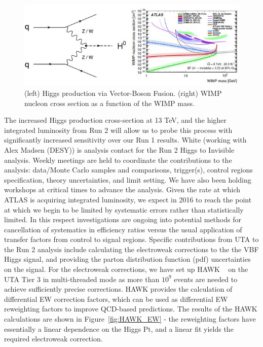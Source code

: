 \begin{figure}[htb]
\centering
      \includegraphics[scale=0.8]{images/Higgs_VBF_diagram.JPG}
\caption{(left) Higgs production via Vector-Boson Fusion. (right) WIMP nucleon cross section as a function of the WIMP mass.}\label{fig:Higgs_VBF_diagram}
\end{figure}


The increased Higgs production cross-section at 13 TeV, and the higher integrated luminosity from Run 2 will allow us to probe this process
with significantly increased sensitivity over our Run 1 results. White (working with Alex Madsen (DESY)) is analysis contact for the
Run 2 Higgs to Invisible analysis. Weekly meetings are held to coordinate the contributions to the analysis: data/Monte Carlo samples and 
comparisons, trigger(s), control regions specification, theory uncertainties, and limit setting. We have also been holding workshops 
at critical times to advance the analysis. 
Given the rate at which ATLAS is acquiring integrated luminosity, we expect in 2016 to reach the point at which we begin to be limited by 
systematic errors rather than statistically limited. In this respect investigations are ongoing into potential methods
for cancellation of systematics in efficiency ratios versus the usual application of transfer factors from control to signal regions.
Specific contributions from UTA to the Run 2 analysis include calculating the electroweak corrections to the the VBF Higgs signal, and
providing the parton distribution function (pdf) uncertainties on the signal. For the electroweak corrections, we have set up HAWK ~\cite{HAWK} 
on the UTA Tier 3 in multi-threaded 
mode as more than $10^{9}$ events are needed to achieve sufficiently precise corrections. HAWK provides the calculation of differential 
EW correction factors, which can be used as differential EW reweighting factors to improve QCD-based predictions. The results of the HAWK
calculations are shown in Figure~\ref{fig:HAWK_EW} - the reweighting factors have essentially a linear dependence on the Higgs Pt, and a linear fit
yields the required electroweak correction. 

